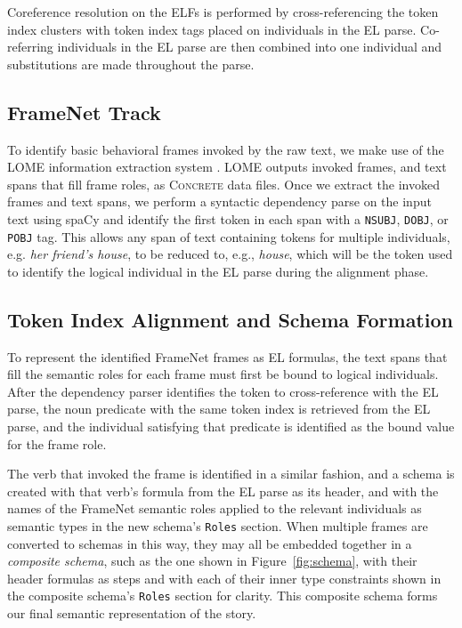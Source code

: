 Coreference resolution on the ELFs is performed by cross-referencing the token index clusters with token index tags placed on individuals in the EL parse. Co-referring individuals in the EL parse are then combined into one individual and substitutions are made throughout the parse.

\subsection{FrameNet Track}
To identify basic behavioral frames invoked by the raw text, we make use of the LOME information extraction system \citep{lome}. LOME outputs invoked frames, and text spans that fill frame roles, as \textsc{Concrete} data files. Once we extract the invoked frames and text spans, we perform a syntactic dependency parse on the input text using spaCy \citep{spacy2} and identify the first token in each span with a \texttt{NSUBJ}, \texttt{DOBJ}, or \texttt{POBJ} tag. This allows any span of text containing tokens for multiple individuals, e.g. \textit{her friend's house}, to be reduced to, e.g., \textit{house}, which will be the token used to identify the logical individual in the EL parse during the alignment phase.

\subsection{Token Index Alignment and Schema Formation}
To represent the identified FrameNet frames as EL formulas, the text spans that fill the semantic roles for each frame must first be bound to logical individuals. After the dependency parser identifies the token to cross-reference with the EL parse, the noun predicate with the same token index is retrieved from the EL parse, and the individual satisfying that predicate is identified as the bound value for the frame role.

The verb that invoked the frame is identified in a similar fashion, and a schema is created with that verb's formula from the EL parse as its header, and with the names of the FrameNet semantic roles applied to the relevant individuals as semantic types in the new schema's \texttt{Roles} section. When multiple frames are converted to schemas in this way, they may all be embedded together in a \textit{composite schema}, such as the one shown in Figure~\ref{fig:schema}, with their header formulas as steps and with each of their inner type constraints shown in the composite schema's \texttt{Roles} section for clarity. This composite schema forms our final semantic representation of the story.

